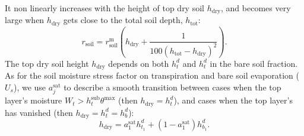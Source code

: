 It non linearly increases with the height of top dry soil $h_\mathrm{dry}$, and becomes very large when $h_\mathrm{dry}$ gets close to the total soil depth, $h_\mathrm{tot}$:
\begin{equation}\label{eq:rsol}
r_\mathrm{soil} = r_\mathrm{soil}^\mathrm{m} \left( h_\mathrm{dry} + \frac{\mathrm{1}}{\mathrm{100}(h_\mathrm{tot}-h_\mathrm{dry})^2}  \right).
\end{equation}
The top dry soil height  $h_\mathrm{dry}$ depends on both $h_t^d$ and $h_t^d$ in the bare soil fraction. As for the soil moisture stress factor on transpiration and bare soil evaporation ($U_s$), we use $a_j^\mathrm{sat}$ to describe a smooth transition between cases when the top layer's moisture  $W_t > h_t^\mathrm{sub} \theta^\mathrm{max}$ (then $h_\mathrm{dry}=h_t^d$),  and cases when the top layer's has vanished (then  $h_\mathrm{dry}=h_t^d=h_b^d$):
\begin{equation}\label{eq:hdry}
h_\mathrm{dry} = a_1^\mathrm{sat} h_{t_1}^d + (\mathrm{1} - a_1^\mathrm{sat})  h_{b_1}^d.
\end{equation}
